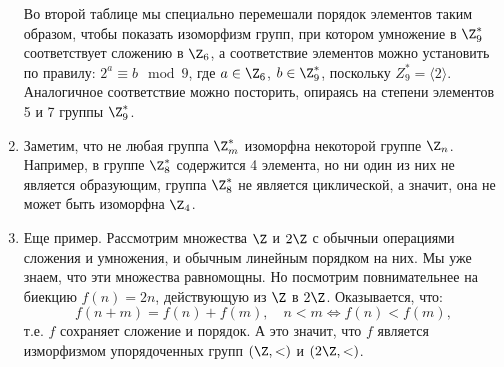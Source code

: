 \begin{enumerate}
Во второй таблице мы специально перемешали порядок элементов таким образом, чтобы показать изоморфизм групп, при котором умножение в $\Z_9^*$ соответствует сложению в $\Z_6$, а соответствие элементов можно установить по правилу: $2^a\equiv b\mod 9$, где $a\in\Z_6$, $b\in\Z_9^*$, поскольку $Z_9^*=\langle 2\rangle$. Аналогичное соответствие можно посторить, опираясь на степени элементов 5 и 7 группы $\Z_9^*$.

\item Заметим, что не любая группа $\Z_m^*$ изоморфна некоторой группе $\Z_n$. Например, в группе $\Z_8^*$ содержится 4 элемента, но ни один из них не является образующим, группа $\Z_8^*$ не является циклической, а значит, она не может быть изоморфна $\Z_4$.

\item Еще пример. Рассмотрим множества $\Z$ и $2\Z$ с обычныи операциями сложения и умножения, и обычным линейным порядком на них. Мы уже знаем, что эти множества равномощны. Но посмотрим повнимательнее на биекцию $f(n)=2n$, действующую из $\Z$ в $2\Z$. Оказывается, что:
$$
f(n+m)=f(n)+f(m),\quad n<m\Leftrightarrow f(n)<f(m),
$$
т.е. $f$ сохраняет сложение и порядок. А это значит, что $f$ является изморфизмом упорядоченных групп $(\Z,<)$ и $(2\Z,<)$.


\end{enumerate}
